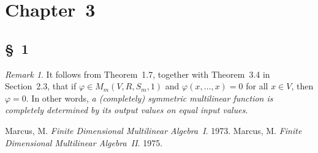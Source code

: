 \documentclass[letterpaper,12pt]{article}
\theoremstyle{definition}
\theoremstyle{remark}
\newtheorem*{rmk}{Remark}
\begin{document}
\newpage
\section*{Chapter~3}
\subsection*{\S~1}
\begin{rmk}
It follows from Theorem~1.7, together with Theorem~3.4 in Section~2.3, that if \(\varphi\in M_m(V,R,S_m,1)\) and \(\varphi(x,\ldots,x)=0\) for all \(x\in V\), then \(\varphi=0\). In other words, \emph{a (completely) symmetric multilinear function is completely determined by its output values on equal input values}.
\end{rmk}

\newpage
\begin{thebibliography}{0}
 Marcus, M. \textit{Finite Dimensional Multilinear Algebra~I}. 1973.
 Marcus, M. \textit{Finite Dimensional Multilinear Algebra~II}. 1975.
\end{thebibliography}
\end{document}
